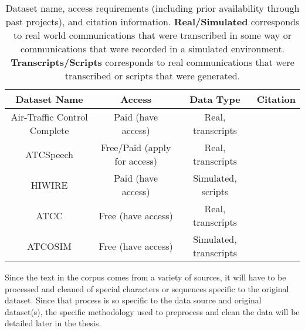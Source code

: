 \documentclass[10pt]{article}
\begin{document}
        \begin{table}[h!]
            \centering
            \begin{tabular}{c|c|c|c}
                Dataset Name & Access & Data Type & Citation \\
                \hline
                Air-Traffic Control Complete & Paid (have access) & Real, transcripts & \cite{godfrey_air_1994} \\
                ATCSpeech & Free/Paid (apply for access) & Real, transcripts & \cite{yang_atcspeech_2020} \\
                HIWIRE & Paid (have access) & Simulated, scripts & \cite{segura_hiwire_2007} \\
                ATCC & Free (have access) & Real, transcripts & \cite{smidl_air_2019} \\
                ATCOSIM & Free (have access) & Simulated, transcripts & \cite{hofbauer_atcosim_2008} \\
            \end{tabular}
            \label{table:datasets}
            \caption{Dataset name, access requirements (including prior availability through past projects), and citation information.
                    \textbf{Real/Simulated} corresponds to real world communications that were transcribed in some way or communications
                    that were recorded in a simulated environment. \textbf{Transcripts/Scripts} corresponds to real communications that were
                    transcribed or scripts that were generated.}
        \end{table}

        Since the text in the corpus comes from a variety of sources, it will have to be processed and cleaned of special characters
        or sequences specific to the original dataset. Since that process is so specific to the data source and original dataset(s),
        the specific methodology used to preprocess and clean the data will be detailed later in the thesis.

\end{document}
